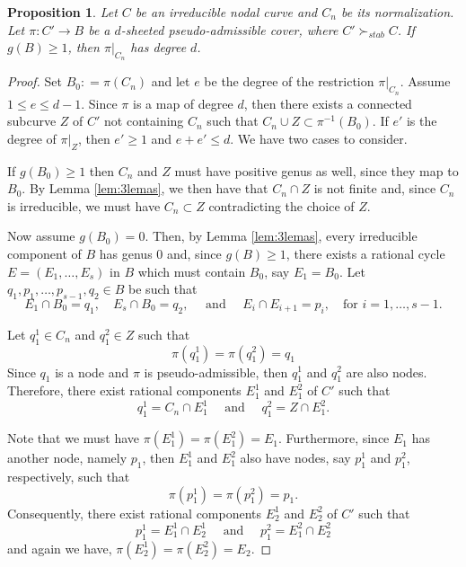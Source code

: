 \documentclass{article}
\newtheorem{proposition}[theorem]{Proposition}
\newcommand{\steq}{\succ_{stab}}
\newcommand{\ee}{\quad\text{ and }\quad}
\renewcommand{\:}{\colon }
\begin{document}
\begin{proposition} \label{prop:degreeofrestriction}%
Let $C$ be an irreducible nodal curve and $C_n$ be its normalization. 
Let  $\pi:{C}'\rightarrow B$ be a $d$-sheeted pseudo-admissible cover, where ${C}'\steq C$. %
If $g(B)\geq 1$, then $\pi|_{C_n}$ has degree $d$.
\end{proposition}
\begin{proof}
Set $B_0: = \pi(C_n)$ and 
let $e$ be the degree of the restriction  $\pi|_{C_n}$.  %
Assume $1\leq e \leq d-1$. 
Since $\pi$ is a map of degree $d$, then there exists a connected subcurve $Z$ of ${C}'$ not containing $C_n$ such that $C_n \cup Z\subset \pi^{-1}(B_0) $. 
If $e'$ is the degree of $\pi|_Z$, then $e'\geq 1$ and $e+e'\leq d$. 
We have two cases to consider.


If $g(B_0)\geq 1$ then $C_n$ and $Z$ must have positive genus as well, since they map to $B_0$. 
By Lemma \ref{lem:3lemas}, we then have that $C_n \cap Z$  is not finite
and,  since $C_n$ is irreducible, we must have $C_n\subset Z$ contradicting the choice of $Z$.

%

Now assume $g(B_0)=0$. Then, by Lemma \ref{lem:3lemas},
every irreducible component of $B$ has genus 0  and, since $g(B)\geq 1$, there exists a rational cycle $E=(E_1,\ldots,E_s)$ in $B$ which  must contain $B_0$, say $E_1=B_0$. 
Let
$q_1,p_1, \ldots, p_{s-1},q_2\in B$ be such that
$$E_1 \cap B_0 = {q_1},
\quad E_s \cap B_0 = {q_2},
\quad \text{ and } \quad 
E_{i}\cap E_{i+1}= {p_{i}},
\quad \text{for } i =1, \ldots, s-1. $$

Let $q^1_1 \in C_n$ and $q_1^2 \in Z$ such that
$$\pi(q_1^1)= \pi(q_1^2)= q_1$$
Since $q_1$ is a node and $\pi$ is pseudo-admissible, then $q_1^1$ and $q_1^2$ are also nodes. Therefore, there exist rational components $E_1^1$ and $E_1^2$ of $C'$  such that
$$q_1^1 = C_n \cap E_1^1\ee q_1^2= Z \cap E_1^2.$$


Note that we must have $\pi(E_1^1)= \pi(E_1^2)= E_1$. 
Furthermore, since $E_1$ has another node, namely $p_1$, then $E_1^1$ and $E_1^2$ also have nodes, say $p_1^1$ and $p_1^2$, respectively, such that
$$\pi(p_1^1)= \pi(p_1^2)= p_1. $$
Consequently, there exist rational components $E_2^1$ and $E_2^2$  of $C'$ such that
$$p_1^1 = E_1^1 \cap E_2^1\ee p_1^2= E_1^2 \cap E_2^2$$
and again
we have, $\pi(E_2^1)=\pi(E_2^2)=E_2$.



\end{proof}
\end{document}
